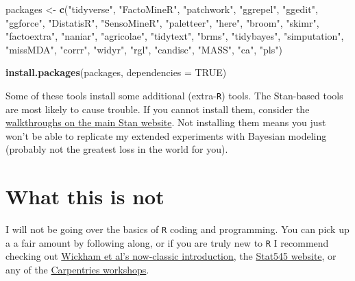 \documentclass[
]{book}
\newenvironment{Shaded}{\begin{snugshade}}{\end{snugshade}}
\newcommand{\AttributeTok}[1]{\textcolor[rgb]{0.13,0.29,0.53}{#1}}
\newcommand{\ConstantTok}[1]{\textcolor[rgb]{0.56,0.35,0.01}{#1}}
\newcommand{\FunctionTok}[1]{\textcolor[rgb]{0.13,0.29,0.53}{\textbf{#1}}}
\newcommand{\NormalTok}[1]{#1}
\newcommand{\OtherTok}[1]{\textcolor[rgb]{0.56,0.35,0.01}{#1}}
\newcommand{\StringTok}[1]{\textcolor[rgb]{0.31,0.60,0.02}{#1}}
\begin{document}
\begin{Shaded}
\begin{Highlighting}[]
\NormalTok{packages }\OtherTok{\textless{}{-}} \FunctionTok{c}\NormalTok{(}\StringTok{"tidyverse"}\NormalTok{, }\StringTok{"FactoMineR"}\NormalTok{, }\StringTok{"patchwork"}\NormalTok{, }\StringTok{"ggrepel"}\NormalTok{, }\StringTok{"ggedit"}\NormalTok{, }\StringTok{"ggforce"}\NormalTok{, }\StringTok{"DistatisR"}\NormalTok{, }\StringTok{"SensoMineR"}\NormalTok{, }\StringTok{"paletteer"}\NormalTok{, }\StringTok{"here"}\NormalTok{, }\StringTok{"broom"}\NormalTok{, }\StringTok{"skimr"}\NormalTok{, }\StringTok{"factoextra"}\NormalTok{, }\StringTok{"naniar"}\NormalTok{, }\StringTok{"agricolae"}\NormalTok{, }\StringTok{"tidytext"}\NormalTok{, }\StringTok{"brms"}\NormalTok{, }\StringTok{"tidybayes"}\NormalTok{, }\StringTok{"simputation"}\NormalTok{, }\StringTok{"missMDA"}\NormalTok{, }\StringTok{"corrr"}\NormalTok{, }\StringTok{"widyr"}\NormalTok{, }\StringTok{"rgl"}\NormalTok{, }\StringTok{"candisc"}\NormalTok{, }\StringTok{"MASS"}\NormalTok{, }\StringTok{"ca"}\NormalTok{, }\StringTok{"pls"}\NormalTok{)}

\FunctionTok{install.packages}\NormalTok{(packages, }\AttributeTok{dependencies =} \ConstantTok{TRUE}\NormalTok{)}
\end{Highlighting}
\end{Shaded}

Some of these tools install some additional (extra-\texttt{R}) tools. The Stan-based tools are most likely to cause trouble. If you cannot install them, consider the \href{https://mc-stan.org/users/interfaces/}{walkthroughs on the main Stan website}. Not installing them means you just won't be able to replicate my extended experiments with Bayesian modeling (probably not the greatest loss in the world for you).

\section*{What this is not}\label{what-this-is-not}

I will not be going over the basics of \texttt{R} coding and programming. You can pick up a a fair amount by following along, or if you are truly new to \texttt{R} I recommend checking out \href{https://r4ds.hadley.nz/}{Wickham et al's now-classic introduction}, the \href{https://stat545.com/}{Stat545 website}, or any of the \href{https://datacarpentry.org/r-socialsci/}{Carpentries workshops}.
\end{document}
